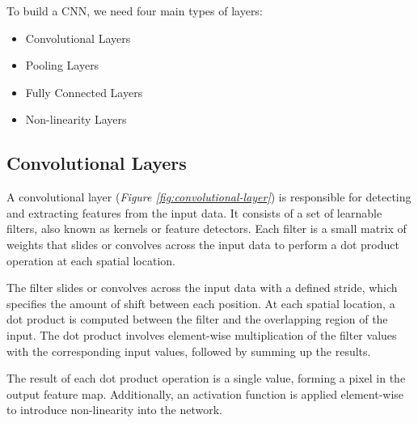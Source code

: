 To build a CNN, we need four main types of layers:

\begin{itemize}
  \item Convolutional Layers
  \item Pooling Layers
  \item Fully Connected Layers
  \item Non-linearity Layers
\end{itemize}

\subsection{Convolutional Layers}

A convolutional layer (\textit{Figure \ref{fig:convolutional-layer}}) is
responsible for detecting and extracting features from the input data. It
consists of a set of learnable filters, also known as kernels or feature
detectors. Each filter is a small matrix of weights that slides or convolves
across the input data to perform a dot product operation at each spatial
location.  \newline

The filter slides or convolves across the input data with a defined stride,
which specifies the amount of shift between each position. At each spatial
location, a dot product is computed between the filter and the overlapping
region of the input. The dot product involves element-wise multiplication of
the filter values with the corresponding input values, followed by summing up
the results. \newline

The result of each dot product operation is a single value, forming a pixel in
the output feature map. Additionally, an activation function is applied
element-wise to introduce non-linearity into the network.

